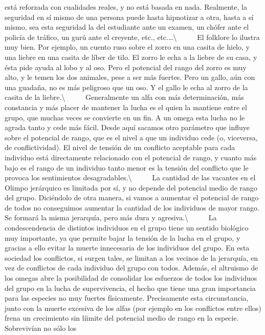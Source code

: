 está reforzada con cualidades reales, y no está basada en nada.
Realmente, la seguridad en sí mismo de una persona puede hasta
hipnotizar a otra, hasta a sí mismo, sea esta seguridad la del
estudiante ante un examen, un chófer ante el policía de tráfico, un gurú
ante el creyente, etc., etc.\ldots{}\textbackslash{} ~ ~ ~ El folklore
lo ilustra muy bien. Por ejemplo, un cuento ruso sobre el zorro en una
casita de hielo, y una liebre en una casita de líber de tilo. El zorro
le echa a la liebre de su casa, y ésta pide ayuda al lobo y al oso. Pero
el potencial del rango del zorro es muy alto, y le temen los dos
animales, pese a ser más fuertes. Pero un gallo, aún con una guadaña, no
es más peligroso que un oso. Y el gallo le echa al zorro de la casita de
la liebre.\textbackslash{} ~ ~ ~ Generalmente un alfa con más
determinación, más constancia y más placer de mantener la lucha es el
quien la mantiene entre el grupo, que muchas veces se convierte en un
fin. A un omega esta lucha no le agrada tanto y cede más fácil. Desde
aquí sacamos otro parámetro que influye sobre el potencial de rango, que
es el nivel a que un individuo cede (o, viceversa, de conflictividad).
El nivel de tensión de un conflicto aceptable para cada individuo está
directamente relacionado con el potencial de rango, y cuanto más bajo es
el rango de un individuo tanto menor es la tensión del conflicto que le
provoca los sentimientos desagradables.\textbackslash{} ~ ~ ~ La
cantidad de las vacantes en el Olimpo jerárquico es limitada por sí, y
no depende del potencial medio de rango del grupo. Diciéndolo de otra
manera, si vamos a aumentar el potencial de rango de todos no
conseguimos aumentar la cantidad de los individuos de mayor rango. Se
formará la misma jerarquía, pero más dura y agresiva.\textbackslash{} ~
~ ~ La condescendencia de distintos individuos en el grupo tiene un
sentido biológico muy importante, ya que permite bajar la tensión de la
lucha en el grupo, y gracias a ello evitar la muerte innecesaria de los
individuos del grupo. En esta sociedad los conflictos, si surgen tales,
se limitan a los vecinos de la jerarquía, en vez de conflictos de cada
individuo del grupo con todos. Además, el altruismo de los omegas abre
la posibilidad de consolidar los esfuerzos de todos los individuos del
grupo en la lucha de supervivencia, el hecho que tiene una gran
importancia para las especies no muy fuertes físicamente. Precisamente
esta circunstancia, junto con la muerte excesiva de los alfas (por
ejemplo en los conflictos entre ellos) frena un crecimiento sin líimite
del potencial medio de rango en la especie. Sobrevivían no sólo los
